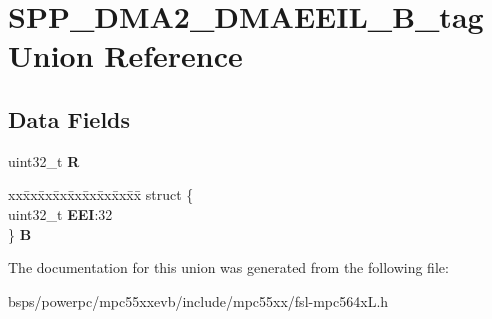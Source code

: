 \hypertarget{unionSPP__DMA2__DMAEEIL__32B__tag}{}\section{S\+P\+P\+\_\+\+D\+M\+A2\+\_\+\+D\+M\+A\+E\+E\+I\+L\+\_\+B\+\_\+tag Union Reference}
\label{unionSPP__DMA2__DMAEEIL__32B__tag}
\subsection*{Data Fields}
\begin{DoxyCompactItemize}
\item 
\mbox{\label{unionSPP__DMA2__DMAEEIL__32B__tag_a98b83e384841f49692f1ba3c9e2e4a96}} 
uint32\+\_\+t {\bfseries R}
\item 
\mbox{\label{unionSPP__DMA2__DMAEEIL__32B__tag_ab4b40741aa86e108102af0379152e025}} 
\begin{tabbing}
xx\=xx\=xx\=xx\=xx\=xx\=xx\=xx\=xx\=\kill
struct \{\\
\>uint32\_t {\bfseries EEI}:32\\
\} {\bfseries B}\\

\end{tabbing}\end{DoxyCompactItemize}


The documentation for this union was generated from the following file\+:\begin{DoxyCompactItemize}
\item 
bsps/powerpc/mpc55xxevb/include/mpc55xx/fsl-\/mpc564x\+L.\+h\end{DoxyCompactItemize}
